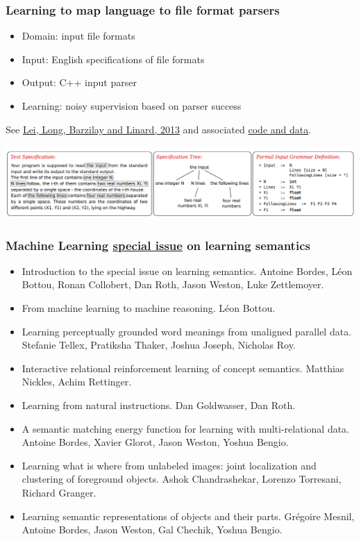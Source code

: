 \documentclass[ignorenonframetext]{beamer}
\begin{document}
\begin{frame}\frametitle{Learning to map language to file format parsers}

\begin{itemize}
\item Domain: input file formats
\item Input: English specifications of file formats
\item Output: C++ input parser
\item Learning: noisy supervision based on parser success
\end{itemize}

See \href{http://www.aclweb.org/anthology/P13-1127}{Lei, Long,
  Barzilay and Linard, 2013} and associated
\href{http://groups.csail.mit.edu/rbg/code/nl2p/}{code and data}.

\begin{center}
\includegraphics[width=\textwidth]{images/lei-input-parser.png}
\end{center}
\end{frame}

\begin{frame}\frametitle{Machine Learning
    \href{http://link.springer.com/journal/10994/94/2/page/1}{special
      issue} on learning semantics}
\begin{itemize}
\item Introduction to the special issue on learning semantics.
Antoine Bordes, Léon Bottou, Ronan Collobert, Dan Roth, Jason Weston,
Luke Zettlemoyer.
\item From machine learning to machine reasoning.
Léon Bottou.
\item Learning perceptually grounded word meanings from unaligned parallel
data.
Stefanie Tellex, Pratiksha Thaker, Joshua Joseph, Nicholas Roy.
\item Interactive relational reinforcement learning of concept semantics.
Matthias Nickles, Achim Rettinger.
\item Learning from natural instructions.
Dan Goldwasser, Dan Roth.
\item A semantic matching energy function for learning with multi-relational
data.
Antoine Bordes, Xavier Glorot, Jason Weston, Yoshua Bengio.
\item Learning what is where from unlabeled images: joint localization and
clustering of foreground objects.
Ashok Chandrashekar, Lorenzo Torresani, Richard Granger.
\item Learning semantic representations of objects and their parts.
Grégoire Mesnil, Antoine Bordes, Jason Weston, Gal Chechik, Yoshua Bengio.
\end{itemize}
\end{frame}
\end{document}
